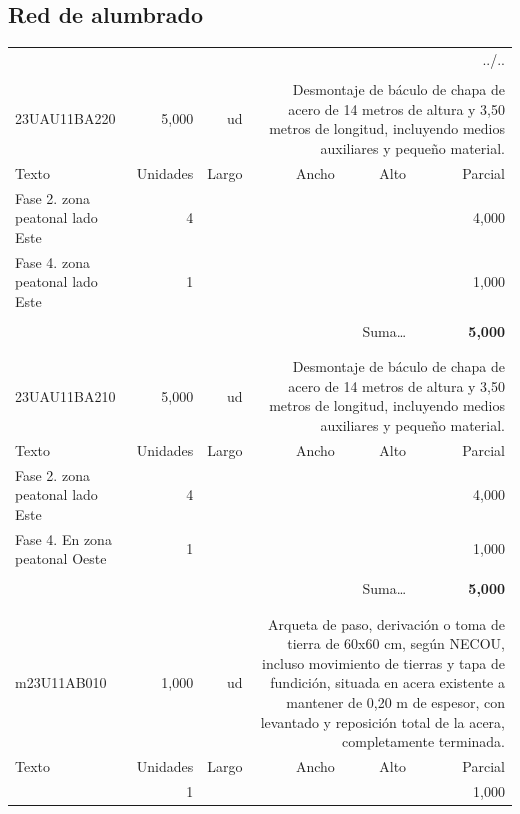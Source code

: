 \documentclass{book}%
\begin{document}
\subsection{Red de alumbrado}%
\begin{longtable}{lrrrrr}%
\multicolumn{6}{r}{../..}\\%
\endfoot%
\endlastfoot%
&&&&&\\%
23UAU11BA220&     5,000& ud&\multicolumn{3}{p{6cm}}{\scriptsize Desmontaje de báculo de chapa de acero de 14 metros de altura y 3,50 metros de longitud, incluyendo medios auxiliares y pequeño material.\normalsize}\\%
Texto&Unidades&Largo&Ancho&Alto&Parcial\\%
\hline%
\multicolumn{1}{p{3.5cm}}{Fase 2.  zona peatonal lado Este}&4&&&&     4,000\\%
\multicolumn{1}{p{3.5cm}}{Fase 4.  zona peatonal lado Este}&1&&&&     1,000\\%
&&&&&\\%
\multicolumn{5}{r}{Suma\ldots}&\textbf{     5,000}\\%
\hline%
&&&&&\\%
&&&&&\\%
23UAU11BA210&     5,000& ud&\multicolumn{3}{p{6cm}}{\scriptsize Desmontaje de báculo de chapa de acero de 14 metros de altura y 3,50 metros de longitud, incluyendo medios auxiliares y pequeño material.\normalsize}\\%
Texto&Unidades&Largo&Ancho&Alto&Parcial\\%
\hline%
\multicolumn{1}{p{3.5cm}}{Fase 2.  zona peatonal lado Este}&4&&&&     4,000\\%
\multicolumn{1}{p{3.5cm}}{Fase 4. En zona peatonal Oeste }&1&&&&     1,000\\%
&&&&&\\%
\multicolumn{5}{r}{Suma\ldots}&\textbf{     5,000}\\%
\hline%
&&&&&\\%
&&&&&\\%
m23U11AB010&     1,000& ud&\multicolumn{3}{p{6cm}}{\scriptsize Arqueta de paso, derivación o toma de tierra de 60x60 cm, según NECOU, incluso movimiento de tierras y tapa de fundición, situada en acera existente a mantener de 0,20 m de espesor, con levantado y reposición total de la acera, completamente terminada.\normalsize}\\%
Texto&Unidades&Largo&Ancho&Alto&Parcial\\%
\hline%
\multicolumn{1}{p{3.5cm}}{ }&1&&&&     1,000\\%

\end{longtable}
\end{document}
